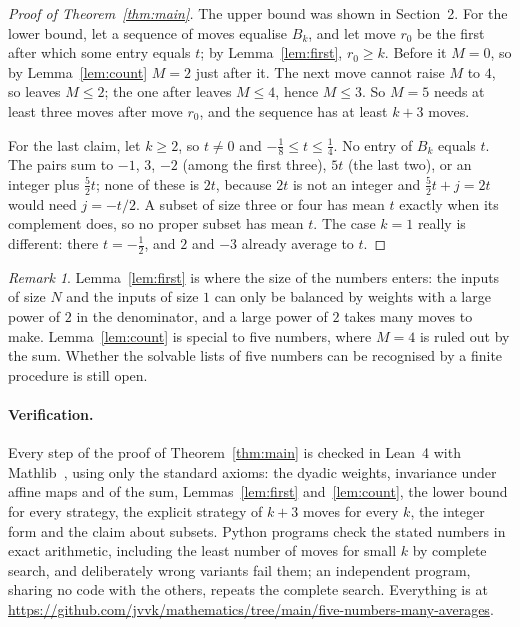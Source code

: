 \documentclass[11pt]{article}
\theoremstyle{remark}
\newtheorem*{remark}{Remark}
\begin{document}
\begin{proof}[Proof of Theorem~\ref{thm:main}]
The upper bound was shown in Section~2. For the lower bound, let a sequence of moves equalise $B_k$, and let
move $r_0$ be the first after which some entry equals $t$; by Lemma~\ref{lem:first}, $r_0\ge k$. Before it
$M=0$, so by Lemma~\ref{lem:count} $M=2$ just after it. The next move cannot raise $M$ to $4$, so leaves
$M\le2$; the one after leaves $M\le4$, hence $M\le3$. So $M=5$ needs at least three moves after move
$r_0$, and the sequence has at least $k+3$ moves.

For the last claim, let $k\ge2$, so $t\ne0$ and $-\frac18\le t\le\frac14$. No entry of $B_k$ equals $t$. The
pairs sum to $-1$, $3$, $-2$ (among the first three), $5t$ (the last two), or an integer plus $\frac52t$;
none of these is $2t$, because $2t$ is not an integer and $\frac52t+j=2t$ would need $j=-t/2$. A subset of
size three or four has mean $t$ exactly when its complement does, so no proper subset has mean $t$. The
case $k=1$ really is different: there $t=-\frac12$, and $2$ and $-3$ already average to $t$.
\end{proof}

\begin{remark}
Lemma~\ref{lem:first} is where the size of the numbers enters: the inputs of size $N$ and the inputs of
size $1$ can only be balanced by weights with a large power of $2$ in the denominator, and a large power of
$2$ takes many moves to make. Lemma~\ref{lem:count} is special to five numbers, where $M=4$ is ruled out by
the sum. Whether the solvable lists of five numbers can be recognised by a finite procedure is still open.
\end{remark}

\paragraph{Verification.} Every step of the proof of Theorem~\ref{thm:main} is checked in Lean~4 with Mathlib~\cite{mathlib}, using only
the standard axioms: the dyadic weights, invariance under affine maps and of the sum, Lemmas~\ref{lem:first}
and~\ref{lem:count}, the lower bound for every strategy, the explicit strategy of $k+3$ moves for every $k$,
the integer form and the claim about subsets. Python programs check the stated numbers in exact arithmetic,
including the least number of moves for small $k$ by complete search, and deliberately wrong variants fail
them; an independent program, sharing no code with the others, repeats the complete search. Everything is at
\url{https://github.com/jvvk/mathematics/tree/main/five-numbers-many-averages}.
\end{document}
